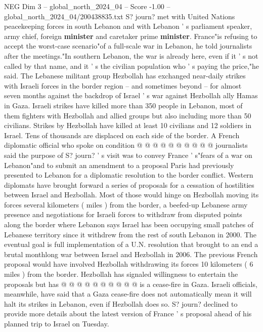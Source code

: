 \begin{textsample}{NEG Dim 3 – global\_north\_2024\_04 – Score -1.00 – global\_north\_2024\_04/200438835.txt}  \label{ex:f3_neg_380}
S? journ? met with United Nations peacekeeping forces in south Lebanon and with Lebanon ' s parliament speaker, army chief, foreign \textbf{minister} and caretaker prime \textbf{minister}.
France"is refusing to accept the worst-case scenario"of a full-scale war in Lebanon, he told journalists after the meetings."In southern Lebanon, the war is already here, even if it ' s not called by that name, and it ' s the civilian population who ' s paying the price,"he said.
The Lebanese militant group Hezbollah has exchanged near-daily strikes with Israeli forces in the border region -- and sometimes beyond -- for almost seven months against the backdrop of Israel ' s war against Hezbollah ally Hamas in Gaza.
Israeli strikes have killed more than 350 people in Lebanon, most of them fighters with Hezbollah and allied groups but also including more than 50 civilians.
Strikes by Hezbollah have killed at least 10 civilians and 12 soldiers in Israel.
Tens of thousands are displaced on each side of the border.
A French diplomatic official who spoke on condition @ @ @ @ @ @ @ @ @ @ journalists said the purpose of S? journ? ' s visit was to convey France ' s"fears of a war on Lebanon"and to submit an amendment to a proposal Paris had previously presented to Lebanon for a diplomatic resolution to the border conflict.
Western diplomats have brought forward a series of proposals for a cessation of hostilities between Israel and Hezbollah.
Most of those would hinge on Hezbollah moving its forces several kilometers ( miles ) from the border, a beefed-up Lebanese army presence and negotiations for Israeli forces to withdraw from disputed points along the border where Lebanon says Israel has been occupying small patches of Lebanese territory since it withdrew from the rest of south Lebanon in 2000.
The eventual goal is full implementation of a U.N. resolution that brought to an end a brutal monthlong war between Israel and Hezbollah in 2006.
The previous French proposal would have involved Hezbollah withdrawing its forces 10 kilometers ( 6 miles ) from the border.
Hezbollah has signaled willingness to entertain the proposals but has @ @ @ @ @ @ @ @ @ @ is a cease-fire in Gaza.
Israeli officials, meanwhile, have said that a Gaza cease-fire does not automatically mean it will halt its strikes in Lebanon, even if Hezbollah does so.
S? journ? declined to provide more details about the latest version of France ' s proposal ahead of his planned trip to Israel on Tuesday.

\end{textsample}
